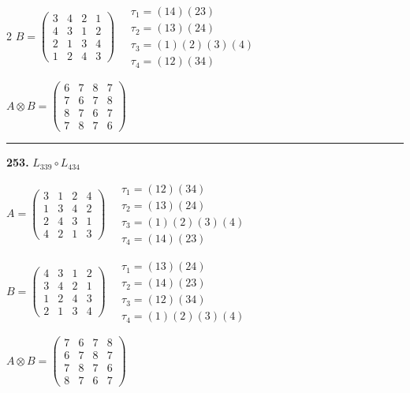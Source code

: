 \begin{multicols}{2}
$B = \begin{pmatrix} 3 & 4 & 2 & 1 \\ 4 & 3 & 1 & 2 \\ 2 & 1 & 3 & 4 \\ 1 & 2 & 4 & 3 \end{pmatrix} \quad \begin{matrix} \tau_{1}=(1 4)(2 3) \\ \tau_{2}=(1 3)(2 4) \\ \tau_{3}=(1)(2)(3)(4) \\ \tau_{4}=(1 2)(3 4) \end{matrix}$

$A \otimes B = \begin{pmatrix} 6 & 7 & 8 & 7 \\ 7 & 6 & 7 & 8 \\ 8 & 7 & 6 & 7 \\ 7 & 8 & 7 & 6 \end{pmatrix}$

\vspace{0.3em}
\hrule
\vspace{0.3em}

\noindent\textbf{253.} $L_{339} \circ L_{434}$

$A = \begin{pmatrix} 3 & 1 & 2 & 4 \\ 1 & 3 & 4 & 2 \\ 2 & 4 & 3 & 1 \\ 4 & 2 & 1 & 3 \end{pmatrix} \quad \begin{matrix} \tau_{1}=(1 2)(3 4) \\ \tau_{2}=(1 3)(2 4) \\ \tau_{3}=(1)(2)(3)(4) \\ \tau_{4}=(1 4)(2 3) \end{matrix}$

$B = \begin{pmatrix} 4 & 3 & 1 & 2 \\ 3 & 4 & 2 & 1 \\ 1 & 2 & 4 & 3 \\ 2 & 1 & 3 & 4 \end{pmatrix} \quad \begin{matrix} \tau_{1}=(1 3)(2 4) \\ \tau_{2}=(1 4)(2 3) \\ \tau_{3}=(1 2)(3 4) \\ \tau_{4}=(1)(2)(3)(4) \end{matrix}$

$A \otimes B = \begin{pmatrix} 7 & 6 & 7 & 8 \\ 6 & 7 & 8 & 7 \\ 7 & 8 & 7 & 6 \\ 8 & 7 & 6 & 7 \end{pmatrix}$


\end{multicols}
